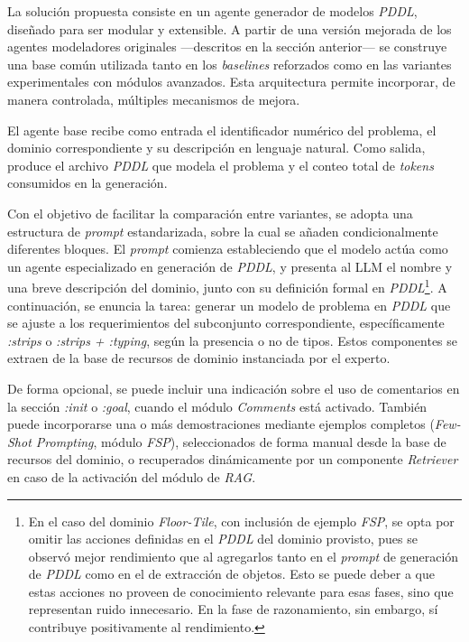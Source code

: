 La solución propuesta consiste en un agente generador de modelos \textit{PDDL}, diseñado para ser modular y extensible. A partir de una versión mejorada de los agentes modeladores originales —descritos en la sección anterior— se construye una base común utilizada tanto en los \textit{baselines} reforzados como en las variantes experimentales con módulos avanzados. Esta arquitectura permite incorporar, de manera controlada, múltiples mecanismos de mejora.

El agente base recibe como entrada el identificador numérico del problema, el dominio correspondiente y su descripción en lenguaje natural. Como salida, produce el archivo \textit{PDDL} que modela el problema y el conteo total de \textit{tokens} consumidos en la generación.

Con el objetivo de facilitar la comparación entre variantes, se adopta una estructura de \textit{prompt} estandarizada, sobre la cual se añaden condicionalmente diferentes bloques. El \textit{prompt} comienza estableciendo que el modelo actúa como un agente especializado en generación de \textit{PDDL}, y presenta al LLM el nombre y una breve descripción del dominio, junto con su definición formal en \textit{PDDL}\footnote{En el caso del dominio \textit{Floor-Tile}, con inclusión de ejemplo \textit{FSP}, se opta por omitir las acciones definidas en el \textit{PDDL} del dominio provisto, pues se observó mejor rendimiento que al agregarlos tanto en el \textit{prompt} de generación de \textit{PDDL} como en el de extracción de objetos. Esto se puede deber a que estas acciones no proveen de conocimiento relevante para esas fases, sino que representan ruido innecesario. En la fase de razonamiento, sin embargo, sí contribuye positivamente al rendimiento.}. A continuación, se enuncia la tarea: generar un modelo de problema en \textit{PDDL} que se ajuste a los requerimientos del subconjunto correspondiente, específicamente \textit{:strips} o \textit{:strips + :typing}, según la presencia o no de tipos. Estos componentes se extraen de la base de recursos de dominio instanciada por el experto.

De forma opcional, se puede incluir una indicación sobre el uso de comentarios en la sección \textit{:init} o \textit{:goal}, cuando el módulo \textit{Comments} está activado. También puede incorporarse una o más demostraciones mediante ejemplos completos (\textit{Few-Shot Prompting}, módulo \textit{FSP}), seleccionados de forma manual desde la base de recursos del dominio, o recuperados dinámicamente por un componente \textit{Retriever} en caso de la activación del módulo de \textit{RAG}.

